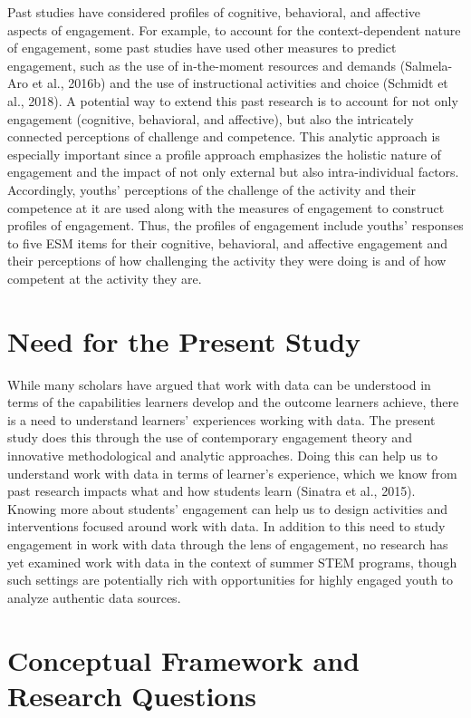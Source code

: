\documentclass[]{msu-thesis}
\theoremstyle{definition}
\theoremstyle{definition}
\theoremstyle{definition}
\theoremstyle{remark}
\begin{document}
Past studies have considered profiles of cognitive, behavioral, and
affective aspects of engagement. For example, to account for the
context-dependent nature of engagement, some past studies have used
other measures to predict engagement, such as the use of in-the-moment
resources and demands (Salmela-Aro et al., 2016b) and the use of
instructional activities and choice (Schmidt et al., 2018). A potential
way to extend this past research is to account for not only engagement
(cognitive, behavioral, and affective), but also the intricately
connected perceptions of challenge and competence. This analytic
approach is especially important since a profile approach emphasizes the
holistic nature of engagement and the impact of not only external but
also intra-individual factors. Accordingly, youths' perceptions of the
challenge of the activity and their competence at it are used along with
the measures of engagement to construct profiles of engagement. Thus,
the profiles of engagement include youths' responses to five ESM items
for their cognitive, behavioral, and affective engagement and their
perceptions of how challenging the activity they were doing is and of
how competent at the activity they are.

\section{Need for the Present Study}\label{need-for-the-present-study}

While many scholars have argued that work with data can be understood in
terms of the capabilities learners develop and the outcome learners
achieve, there is a need to understand learners' experiences working
with data. The present study does this through the use of contemporary
engagement theory and innovative methodological and analytic approaches.
Doing this can help us to understand work with data in terms of
learner's experience, which we know from past research impacts what and
how students learn (Sinatra et al., 2015). Knowing more about students'
engagement can help us to design activities and interventions focused
around work with data. In addition to this need to study engagement in
work with data through the lens of engagement, no research has yet
examined work with data in the context of summer STEM programs, though
such settings are potentially rich with opportunities for highly engaged
youth to analyze authentic data sources.

\section{Conceptual Framework and Research
Questions}\label{conceptual-framework-and-research-questions}
\end{document}
